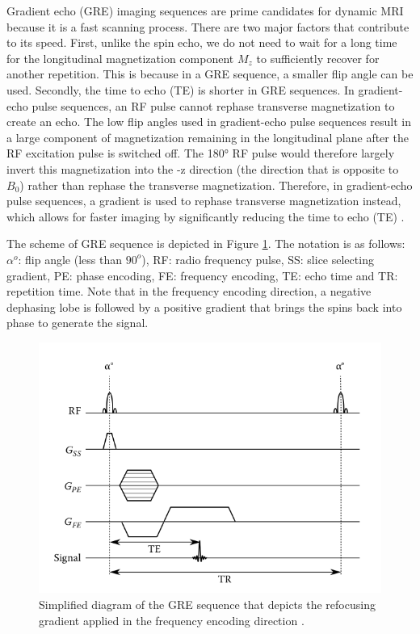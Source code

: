 \documentclass{micro-econ-thesis}
\begin{document}
Gradient echo (GRE) imaging sequences are prime candidates for dynamic MRI because it is a fast scanning process. There are two major factors that contribute to its speed. First, unlike the spin echo, we do not need to wait for a long time for the longitudinal magnetization component $M_z$ to sufficiently recover for another repetition. This is because in a GRE sequence, a smaller flip angle can be used. Secondly, the time to echo (TE) is shorter in GRE sequences. In gradient-echo pulse sequences, an RF pulse cannot rephase transverse magnetization to create an echo. The low flip angles used in gradient-echo pulse sequences result in a large component of magnetization remaining in the longitudinal plane after the RF excitation pulse is switched off. The 180° RF pulse would therefore largely invert this magnetization into the -z direction (the direction that is opposite to $B_0$) rather than rephase the transverse magnetization. Therefore, in gradient-echo pulse sequences, a gradient is used to rephase transverse magnetization instead, which allows for faster imaging by significantly reducing the time to echo (TE) \parencite[p.94]{westbrook_mri_2019}.

The scheme of GRE sequence is depicted in Figure \ref{fig:gresimplified}. The notation is as follows: $\alpha^o$: flip angle (less than $90^o$), RF: radio frequency pulse, SS: slice selecting gradient, PE: phase encoding, FE: frequency encoding, TE: echo time and TR: repetition time. Note that in the frequency encoding direction, a negative dephasing lobe is followed by a positive gradient that brings the spins back into phase to generate the signal.    
\begin{figure}[H]
	\centering
	\includegraphics[width=0.7\linewidth]{gre_simplified}
	\caption{Simplified diagram of the GRE sequence that depicts the refocusing gradient applied in the frequency encoding direction \parencite[p.233]{berry_fundamentals_2009}.}
	\label{fig:gresimplified}
\end{figure}
\end{document}
